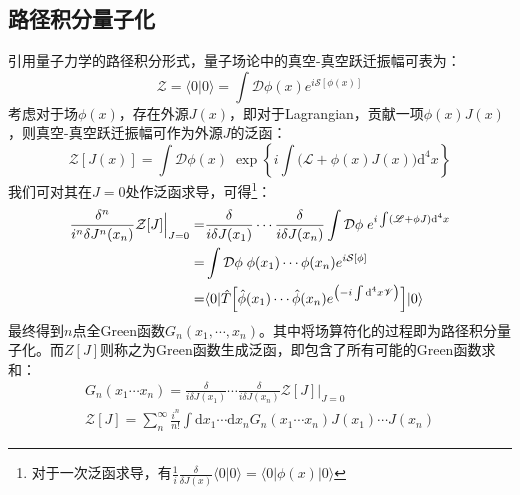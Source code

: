 \subsection{路径积分量子化}
引用量子力学的路径积分形式，量子场论中的真空-真空跃迁振幅可表为：
\begin{equation}
\mathcal{Z}=\langle0|0\rangle=\int\mathcal{D}\phi(x)e^{i\mathcal{S}[\phi(x)]}
\end{equation}
考虑对于场$\phi(x)$，存在外源$J(x)$，即对于Lagrangian，贡献一项$\phi(x)J(x)$，则真空-真空跃迁振幅可作为外源$J$的泛函：
\begin{equation}
\mathcal{Z}[J(x)]=\int\mathcal{D}\phi(x)\;\exp\left\lbrace i\int\Big(\mathscr{L}+\phi(x)J(x)\Big)\mathrm{d}^4 x\right\rbrace 
\end{equation}
我们可对其在$J=0$处作泛函求导，可得\footnote{对于一次泛函求导，有$\frac{1
	}{i}\frac{\delta}{\delta J(x)}\langle0|0\rangle=\langle0|\phi(x)|0\rangle$
}：
\begin{align}
\frac{\delta^n}{i^n\delta J^n(x_n)}\mathcal{Z}[J]\Big|_{J=0}=&\frac{\delta}{i\delta J(x_1)}\cdots\frac{\delta}{i\delta J(x_n)}\int\mathcal{D}\phi\;e^ {i\int(\mathscr{L}+\phi J)\mathrm{d}^4x}\notag\\
=&\int\mathcal{D}\phi\;\phi(x_1)\cdots\phi(x_n)e^{i\mathcal{S}[\phi]}\notag\\
=&\langle0|\hat{T}\Big[\hat{\phi}(x_1)\cdots\hat{\phi}(x_n) e^{\left(-i\int\mathrm{d}^4x\mathscr{V}\right)}\Big]|0\rangle
\end{align}
最终得到$n$点全Green函数$G_n(x_1,\cdots,x_n)$。其中将场算符化的过程即为路径积分量子化。而$Z[J]$则称之为Green函数生成泛函，即包含了所有可能的Green函数求和：
\begin{gather}
G_n(x_1\cdots x_n)=\frac{\delta}{i\delta J(x_1)}\cdots\frac{\delta}{i\delta J(x_n)}\mathcal{Z}[J]\Big|_{J=0}\\
\mathcal{Z}[J]=\sum_{n}^{\infty}\frac{i^n}{n!}\int\mathrm{d}x_1\cdots\mathrm{d}x_n G_n(x_1\cdots x_n)J(x_1)\cdots J(x_n)
\end{gather}

